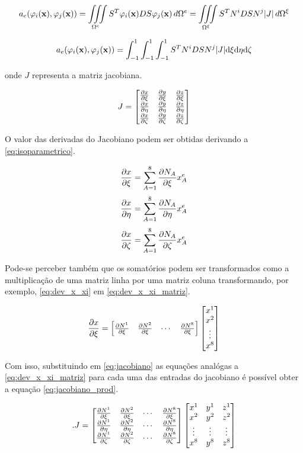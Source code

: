 \begin{equation}
 a_e(\phiix,\phijx) = \omeeint{S^T\phiix D S\phijx} = \omeint[\Omega^\xi]{S^T N^i D S N^j |J|}
\end{equation}


\begin{equation}
 a_e(\phiix,\phijx) = \int^1_ {-1}\int^1_ {-1}\int^1_ {-1}{S^T N^i D S N^j |J|} \text{d}\xi \text{d}\eta \text{d}\zeta
\end{equation}

onde $J$ representa a matriz jacobiana.

\begin{equation}
J = \begin{bmatrix}
\dxi[x]   &   \dxi[y] &   \dxi[z] \\
\deta[x]  &  \deta[y] &  \deta[z] \\
\dzeta[x] & \dzeta[y] & \dzeta[z]
\end{bmatrix}
\label{eq:jacobiano}
\end{equation}

O valor das derivadas do Jacobiano podem ser obtidas derivando a \ref{eq:isoparametrico}.


\begin{equation}\label{eq:dev_x_xi}
\dxi[x] = \sum^8_{A=1} \dxi[N_A] x^e_A
\end{equation}
\begin{equation}
\deta[x] = \sum^8_{A=1} \deta[N_A] x^e_A
\end{equation}
\begin{equation}
\dzeta[x] = \sum^8_{A=1} \dzeta[N_A] x^e_A
\end{equation}



Pode-se perceber também que os somatórios podem ser transformados como a multiplicação de uma matriz linha por uma matriz coluna transformando, por exemplo, \ref{eq:dev_x_xi} em \ref{eq:dev_x_xi_matriz}.

\begin{equation}\label{eq:dev_x_xi_matriz}
\dxi[x] =
\begin{bmatrix}
 \dxi[N^1]   & \dxi[N^2] & \cdots & \dxi[N^8]
\end{bmatrix}
\begin{bmatrix}
x^1    \\
x^2    \\
\vdots  \\
x^8
\end{bmatrix}
\end{equation}

Com isso, substituindo em \ref{eq:jacobiano} as equações analógas a \ref{eq:dev_x_xi_matriz} para cada uma das entradas do jacobiano é possível obter a equação \ref{eq:jacobiano_prod}.


\begin{equation}\label{eq:jacobiano_prod}.
J = \der
\begin{bmatrix}
x^1 & y^1 & z^1 \\
x^2 & y^2 & z^2 \\
\vdots & \vdots  & \vdots  \\
x^8 & y^8 & z^8 \\
\end{bmatrix}
\end{equation}


